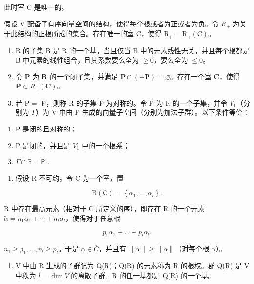 此时室 C 是唯一的。

假设 V 配备了有序向量空间的结构，使得每个根或者为正或者为负。令 \(R_{+}\) 为关于此结构的正根所成的集合。存在唯一的室 C，使得 \(\mathrm{R}_{+} = \mathrm{R}_{+}(\mathrm{C})\)。

\begin{enumerate}
\def\labelenumi{\arabic{enumi})}
\setcounter{enumi}{21}
\item
  R 的子集 B 是 R 的一个基，当且仅当 B 中的元素线性无关，并且每个根都是 B 中元素的线性组合，且其系数要么全为 \(\geqslant 0\)，要么全为 \(\leqslant 0\)。
\item
  令 \(\mathbf{P}\) 为 \(\mathbf{R}\) 的一个闭子集，并满足 \(\mathbf{P} \cap (-\mathbf{P}) = \varnothing\)。存在一个室 \(\mathbf{C}\)，使得 \(\mathbf{P} \subset R_{+}(\mathbf{C})\)。
\item
  若 P = -P，则称 R 的子集 P 为对称的。令 P 为 R 的一个子集，并令 \(V_{1}\)（分别为 \(\Gamma\)）为 V 中由 P 生成的向量子空间（分别为加法子群）。以下条件等价：
\end{enumerate}

\begin{enumerate}
\def\labelenumi{\alph{enumi})}
\item
  P 是闭的且对称的；
\item
  P 是闭的，并且是 \(V_{1}\) 中的一个根系；
\item
  \(\Gamma \cap \mathbb{R} = \mathbb{P}\) .
\end{enumerate}

\begin{enumerate}
\def\labelenumi{\arabic{enumi})}
\setcounter{enumi}{24}
\tightlist
\item
  假设 R 不可约。令 C 为一个室，置
\end{enumerate}

\[
\mathrm{B} (\mathrm{C}) = \left\{\alpha_ {1}, \dots , \alpha_ {l} \right\}.
\]

R 中存在最高元素（相对于 C 所定义的序），即存在 R 的一个元素 \(\tilde{\alpha}=n_{1}\alpha_{1}+\cdots+n_{l}\alpha_{l}\)，使得对于任意根

\[
p _ {1} \alpha_{1} + \dots + p _ {l} \alpha_{l}.
\]

\(n_1 \geqslant p_1, \ldots, n_l \geqslant p_l\)。于是 \(\tilde{\alpha} \in \overline{C}\)，并且有 \(\| \tilde{\alpha} \| \geqslant \| \alpha \|\)（对每个根 \(\alpha\)）。

\begin{enumerate}
\def\labelenumi{\arabic{enumi})}
\setcounter{enumi}{25}
\tightlist
\item
  V 中由 R 生成的子群记为 Q(R)；Q(R) 的元素称为 R 的根权。群 Q(R) 是 V 中秩为 \(l = \dim V\) 的离散子群。R 的任一基都是 Q(R) 的一个基。
\end{enumerate}

